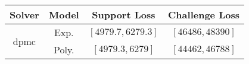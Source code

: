 \begin{tabular}{cc|c|c} 
\hline 
 Solver & Model & Support Loss  & Challenge Loss \tabularnewline\hline 
\hline 
\multirow{2}{*}{dpmc} & Exp. & $\left[4979.7,6279.3\right]$ & $\left[46486,48390\right]$ \tabularnewline 
 & Poly. & $\left[4979.3,6279\right]$ & $\left[44462,46788\right]$ \tabularnewline 
\hline 
\end{tabular} 


